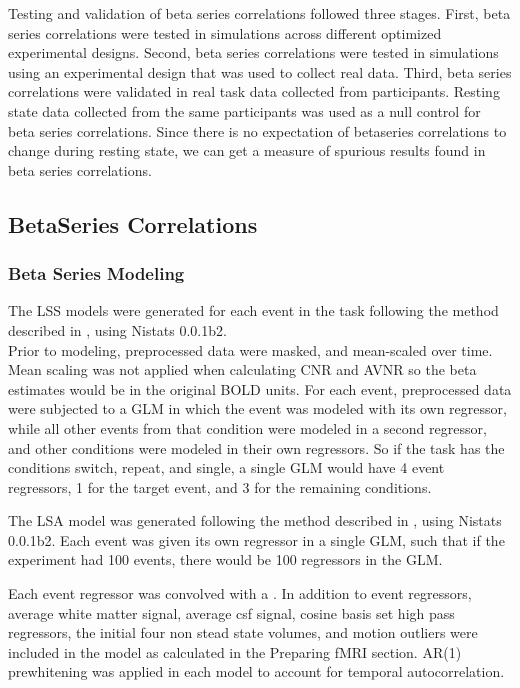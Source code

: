 \documentclass[10pt,letterpaper]{article}
\begin{document}
Testing and validation of beta series correlations followed three stages.
First, beta series correlations were tested in simulations across different
optimized experimental designs.
Second, beta series correlations were tested in simulations using an experimental
design that was used to collect real data.
Third, beta series correlations were validated in real task data collected from
participants.
Resting state data collected from the same participants was used as a null
control for beta series correlations.
Since there is no expectation of betaseries correlations to change
during resting state, we can get a measure of spurious results found
in beta series correlations.

\subsection*{BetaSeries Correlations}
\label{methods:bsc}

\subsubsection*{Beta Series Modeling}
\label{methods:bsc_model}

The LSS models were generated for each event in
the task following the method described in \cite{Turner2012a}, using
Nistats 0.0.1b2.\\
Prior to modeling, preprocessed data were masked, and mean-scaled over
time.
Mean scaling was not applied when calculating CNR and AVNR so the
beta estimates would be in the original BOLD units.
For each event, preprocessed data were subjected to a GLM
in which the event was modeled with its own regressor, while
all other events from that condition were modeled in a second regressor,
and other conditions were modeled in their own regressors.
So if the task has the conditions switch, repeat, and single, 
a single GLM would have 4 event regressors, 1 for the target
event, and 3 for the remaining conditions.

The LSA model was generated following the method described in
\cite[Rissman 2004]{Rissman2004}, using Nistats 0.0.1b2.
Each event was given its own regressor in a single GLM, such that
if the experiment had 100 events, there would be 100 regressors in the GLM.

Each event regressor was convolved with a \cite[glover hemodynamic response
function]{Glover1999}.
In addition to event regressors, average white matter signal, average csf signal,
cosine basis set high pass regressors, the initial four non stead state volumes, 
and motion outliers were included
in the model as calculated in the Preparing fMRI section.
AR(1) prewhitening was applied in each model to account
for temporal autocorrelation.
\end{document}
